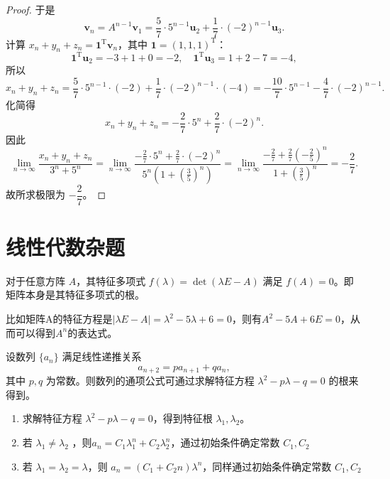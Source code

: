 \begin{proof}
于是  
\[
\mathbf{v}_n = A^{n-1}\mathbf{v}_1 = \frac{5}{7} \cdot 5^{n-1} \mathbf{u}_2 + \frac{1}{7} \cdot (-2)^{n-1} \mathbf{u}_3.
\]  
计算 \(x_n + y_n + z_n = \mathbf{1}^\mathrm{T} \mathbf{v}_n\)，其中 \(\mathbf{1} = (1,1,1)^\mathrm{T}\)：  
\[
\mathbf{1}^\mathrm{T} \mathbf{u}_2 = -3 + 1 + 0 = -2,\quad \mathbf{1}^\mathrm{T} \mathbf{u}_3 = 1 + 2 - 7 = -4,
\]  
所以  
\[
x_n + y_n + z_n = \frac{5}{7} \cdot 5^{n-1} \cdot (-2) + \frac{1}{7} \cdot (-2)^{n-1} \cdot (-4) = -\frac{10}{7} \cdot 5^{n-1} - \frac{4}{7} \cdot (-2)^{n-1}.
\]  
化简得  
\[
x_n + y_n + z_n = -\frac{2}{7} \cdot 5^n + \frac{2}{7} \cdot (-2)^n.
\]  
因此  
\[
\lim_{n \to \infty} \frac{x_n + y_n + z_n}{3^n + 5^n} = \lim_{n \to \infty} \frac{-\frac{2}{7} \cdot 5^n + \frac{2}{7} \cdot (-2)^n}{5^n \left(1 + \left(\frac{3}{5}\right)^n\right)} = \lim_{n \to \infty} \frac{-\frac{2}{7} + \frac{2}{7} \left(-\frac{2}{5}\right)^n}{1 + \left(\frac{3}{5}\right)^n} = -\frac{2}{7}.
\]  
故所求极限为 \(-\dfrac{2}{7}\)。  

\end{proof}


\section{线性代数杂题}

\begin{theorem}
对于任意方阵 $A$，其特征多项式 $f(\lambda) = \det(\lambda E - A)$ 满足 $f(A) = 0$。即矩阵本身是其特征多项式的根。
\end{theorem}
比如矩阵A的特征方程是$ |\lambda E - A|=\lambda^2 - 5\lambda + 6 = 0 $，则有$ A^2 - 5A + 6E = 0 $，从而可以得到$ A^n $的表达式。

\begin{lemma}
设数列 \(\{a_n\}\) 满足线性递推关系
\[
a_{n+2} = p a_{n+1} + q a_n,
\]
其中 $p, q$ 为常数。则数列的通项公式可通过求解特征方程 $\lambda^2 - p\lambda - q = 0$ 的根来得到。
\begin{enumerate}[label=step~\arabic*]
\item 求解特征方程 $\lambda^2 - p\lambda - q = 0$，得到特征根 $\lambda_1, \lambda_2$。
\item 若 $\lambda_1 \neq \lambda_2$ ，则$ a_n = C_1 \lambda_1^n + C_2 \lambda_2^n $，通过初始条件确定常数 $C_1, C_2$
\item 若 $\lambda_1 = \lambda_2 = \lambda$，则 $ a_n = (C_1 + C_2 n) \lambda^n $，同样通过初始条件确定常数 $C_1, C_2$
\end{enumerate}
\end{lemma}

